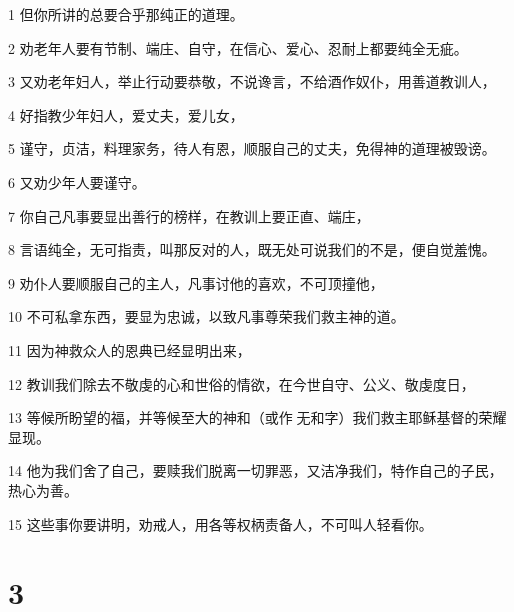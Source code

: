 \par 1 但你所讲的总要合乎那纯正的道理。
\par 2 劝老年人要有节制、端庄、自守，在信心、爱心、忍耐上都要纯全无疵。
\par 3 又劝老年妇人，举止行动要恭敬，不说谗言，不给酒作奴仆，用善道教训人，
\par 4 好指教少年妇人，爱丈夫，爱儿女，
\par 5 谨守，贞洁，料理家务，待人有恩，顺服自己的丈夫，免得神的道理被毁谤。
\par 6 又劝少年人要谨守。
\par 7 你自己凡事要显出善行的榜样，在教训上要正直、端庄，
\par 8 言语纯全，无可指责，叫那反对的人，既无处可说我们的不是，便自觉羞愧。
\par 9 劝仆人要顺服自己的主人，凡事讨他的喜欢，不可顶撞他，
\par 10 不可私拿东西，要显为忠诚，以致凡事尊荣我们救主神的道。
\par 11 因为神救众人的恩典已经显明出来，
\par 12 教训我们除去不敬虔的心和世俗的情欲，在今世自守、公义、敬虔度日，
\par 13 等候所盼望的福，并等候至大的神和（或作无和字）我们救主耶稣基督的荣耀显现。
\par 14 他为我们舍了自己，要赎我们脱离一切罪恶，又洁净我们，特作自己的子民，热心为善。
\par 15 这些事你要讲明，劝戒人，用各等权柄责备人，不可叫人轻看你。

\chapter{3}

